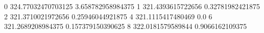 0 324.77032470703125 3.658782958984375
1 321.4393615722656 0.32781982421875
2 321.3710021972656 0.25946044921875
4 321.1115417480469 0.0
6 321.2689208984375 0.157379150390625
8 322.0181579589844 0.9066162109375

